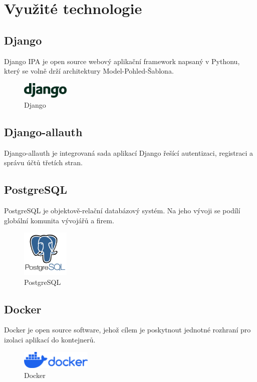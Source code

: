 \documentclass[12pt, a4paper,
twoside,        %
openright
]{report}
\begin{document}
\chapter{Využité technologie}

\section{Django}
\label{sec:django}
Django IPA je open source webový aplikační framework napsaný v Pythonu, který se volně drží architektury Model-Pohled-Šablona.
	\begin{figure}[h!]
		\centering
		\includegraphics[width=0.2\textwidth]{image/logo-django.png}
		\caption{Django}
		\label{fig:logodjango}
	\end{figure}

\section{Django-allauth}
\label{sec:django-allauthl}
Django-allauth je integrovaná sada aplikací Django řešící autentizaci, registraci a správu účtů třetích stran.

\section{PostgreSQL}
\label{sec:postgresql}
PostgreSQL je objektově-relační databázový systém. Na jeho vývoji se podílí globální komunita vývojářů a firem.
	\begin{figure}[h!]
		\centering
		\includegraphics[width=0.2\textwidth]{image/logo-postgresql.png}
		\caption{PostgreSQL}
		\label{fig:postgresql}
	\end{figure}

\newpage

\section{Docker}
\label{sec:docker}
Docker je open source software, jehož cílem je poskytnout jednotné rozhraní pro izolaci aplikací do kontejnerů.
	\begin{figure}[h!]
		\centering
		\includegraphics[width=0.3\textwidth]{image/logo-docker.png}
		\caption{Docker}
		\label{fig:docker}
	\end{figure}
\end{document}
